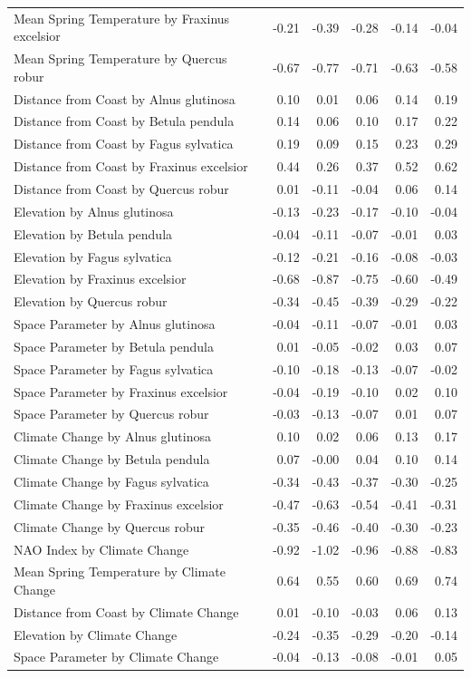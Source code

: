 \documentclass{article}\usepackage[]{graphicx}\usepackage[]{color}
\begin{document}
\begin{longtable}{lrrrrr}
  Mean Spring 
Temperature
by Fraxinus excelsior & -0.21 & -0.39 & -0.28 & -0.14 & -0.04 \\ 
  Mean Spring 
Temperature
by Quercus robur & -0.67 & -0.77 & -0.71 & -0.63 & -0.58 \\ 
  Distance from 
Coast
by Alnus glutinosa & 0.10 & 0.01 & 0.06 & 0.14 & 0.19 \\ 
  Distance from 
Coast
by Betula pendula & 0.14 & 0.06 & 0.10 & 0.17 & 0.22 \\ 
  Distance from 
Coast
by Fagus sylvatica & 0.19 & 0.09 & 0.15 & 0.23 & 0.29 \\ 
  Distance from 
Coast
by Fraxinus excelsior & 0.44 & 0.26 & 0.37 & 0.52 & 0.62 \\ 
  Distance from 
Coast
by Quercus robur & 0.01 & -0.11 & -0.04 & 0.06 & 0.14 \\ 
  Elevation
by Alnus glutinosa & -0.13 & -0.23 & -0.17 & -0.10 & -0.04 \\ 
  Elevation
by Betula pendula & -0.04 & -0.11 & -0.07 & -0.01 & 0.03 \\ 
  Elevation
by Fagus sylvatica & -0.12 & -0.21 & -0.16 & -0.08 & -0.03 \\ 
  Elevation
by Fraxinus excelsior & -0.68 & -0.87 & -0.75 & -0.60 & -0.49 \\ 
  Elevation
by Quercus robur & -0.34 & -0.45 & -0.39 & -0.29 & -0.22 \\ 
  Space Parameter
by Alnus glutinosa & -0.04 & -0.11 & -0.07 & -0.01 & 0.03 \\ 
  Space Parameter
by Betula pendula & 0.01 & -0.05 & -0.02 & 0.03 & 0.07 \\ 
  Space Parameter
by Fagus sylvatica & -0.10 & -0.18 & -0.13 & -0.07 & -0.02 \\ 
  Space Parameter
by Fraxinus excelsior & -0.04 & -0.19 & -0.10 & 0.02 & 0.10 \\ 
  Space Parameter
by Quercus robur & -0.03 & -0.13 & -0.07 & 0.01 & 0.07 \\ 
  Climate Change
by Alnus glutinosa & 0.10 & 0.02 & 0.06 & 0.13 & 0.17 \\ 
  Climate Change
by Betula pendula & 0.07 & -0.00 & 0.04 & 0.10 & 0.14 \\ 
  Climate Change
by Fagus sylvatica & -0.34 & -0.43 & -0.37 & -0.30 & -0.25 \\ 
  Climate Change
by Fraxinus excelsior & -0.47 & -0.63 & -0.54 & -0.41 & -0.31 \\ 
  Climate Change
by Quercus robur & -0.35 & -0.46 & -0.40 & -0.30 & -0.23 \\ 
  NAO Index by Climate Change & -0.92 & -1.02 & -0.96 & -0.88 & -0.83 \\ 
  Mean Spring 
Temperature by Climate Change & 0.64 & 0.55 & 0.60 & 0.69 & 0.74 \\ 
  Distance from 
Coast by Climate Change & 0.01 & -0.10 & -0.03 & 0.06 & 0.13 \\ 
  Elevation by Climate Change & -0.24 & -0.35 & -0.29 & -0.20 & -0.14 \\ 
  Space Parameter by Climate Change & -0.04 & -0.13 & -0.08 & -0.01 & 0.05 \\ 
   \hline
\hline
\end{longtable}
\end{document}
